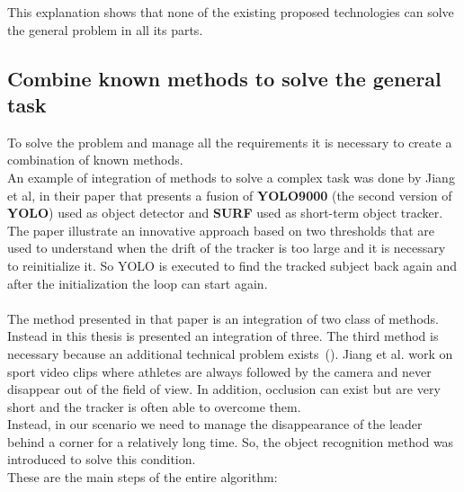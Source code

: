 This explanation shows that none of the existing proposed technologies can solve the general problem in all its parts.

\subsection{Combine known methods to solve the general task}
To solve the problem and manage all the requirements it is necessary to create a combination of known methods.\\
An example of integration of methods to solve a complex task was done by Jiang et al, in their paper\cite{multi-feature-fusion-and-YOLO} that presents a fusion of \textbf{YOLO9000}\cite{yoloV2} (the second version of \textbf{YOLO}\cite{yolo}) used as object detector and \textbf{SURF}\cite{surf} used as short-term object tracker.\\
The paper illustrate an innovative approach based on two thresholds that are used to understand when the drift of the tracker is too large and it is necessary to reinitialize it. So YOLO is executed to find the tracked subject back again and after the initialization the loop can start again.\\
\\
The method presented in that paper is an integration of two class of methods. Instead in this thesis is presented an integration of three. The third method is necessary because an additional technical problem exists~(). Jiang et al. work on sport video clips where athletes are always followed by the camera and never disappear out of the field of view. In addition, occlusion can exist but are very short and the tracker is often able to overcome them.\\
Instead, in our scenario we need  to manage the disappearance of the leader behind a corner for a relatively long time. So, the object recognition method was introduced to solve this condition.\\ 
These are the main steps of the entire algorithm:
